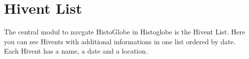 \section{Hivent List}
The central modul to navgate HistoGlobe in Histoglobe is the Hivent List. 
Here you can see Hivents with additional informations in one list ordered by date.
Each Hivent has a name, a date and a location.
\newpage